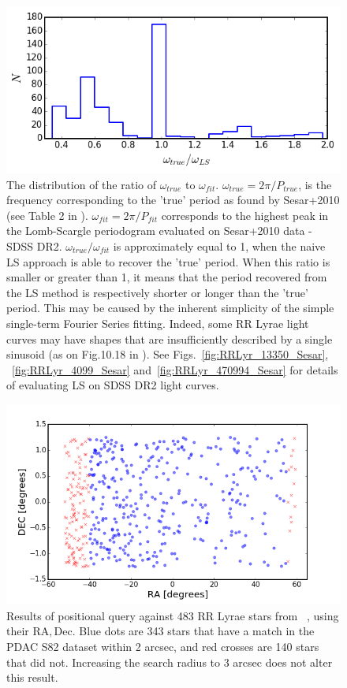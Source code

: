 \documentclass[DM,lsstdraft,toc]{lsstdoc}
\begin{document}
\begin{figure}
\begin{centering}
\includegraphics[width=0.7\columnwidth]{figs/Fig_3_RRLyr_omega_ratio}
\caption{The distribution of the ratio of $\omega_{true}$ to $\omega_{fit}$.  $\omega_{true} = 2 \pi / P_{true}$, is the frequency corresponding to the 'true' period as found by Sesar+2010 (see Table 2 in \citep{2010ApJ...708..717S}).  $\omega_{fit} = 2 \pi / P_{fit}$ corresponds to the highest peak in the Lomb-Scargle periodogram evaluated on Sesar+2010 data  - SDSS DR2.  $\omega_{true} /  \omega_{fit}$ is approximately equal to 1, when the naive  LS approach is able to recover the 'true' period.  When this ratio is smaller or greater than 1, it means that the period recovered from the LS method is  respectively shorter or longer than the 'true' period. This may be caused by the inherent simplicity of the simple single-term Fourier Series fitting. Indeed, some RR Lyrae light curves may have shapes that are insufficiently described by a single sinusoid (as on Fig.10.18  in \citep{2014sdmm.book.....I}). See Figs.~\ref{fig:RRLyr_13350_Sesar}, ~\ref{fig:RRLyr_4099_Sesar} and~\ref{fig:RRLyr_470994_Sesar} for details of evaluating LS on SDSS DR2 light curves.}
\label{fig:RRLyr_period_ratios}
\end{centering}
\end{figure}

\begin{figure}
\includegraphics[width=\columnwidth]{figs/missing_and_recovered_RR_Lyr_PDAC}
\caption{Results of positional query against 483 RR Lyrae stars from ~\citep{2010ApJ...708..717S}, using their $\mathrm{RA}, \mathrm{Dec}$. Blue dots are 343 stars that have a match in the PDAC S82 dataset within 2 arcsec, and red crosses are 140 stars that did not. Increasing the search radius to 3 arcsec does not alter this result. }
\label{fig:PDAC_query_ra_dec}
\end{figure}
\end{document}
